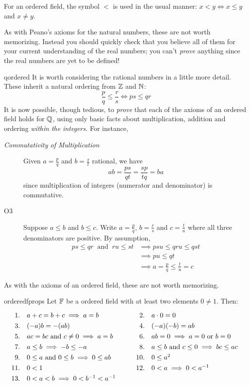 For an ordered field, the symbol $<$ is used in the usual manner: $x<y\iff x\le y$ and $x\neq y$.
\smallbreak

As with Peano's axioms for the natural numbers, these are not worth memorizing. Instead you should quickly check that you believe all of them for your current understanding of the real numbers; you can't \emph{prove} anything since the real numbers are yet to be defined!
\smallbreak


\begin{example}{}{qordered}
	It is worth considering the rational numbers in a little more detail. These inherit a natural ordering from $\mathbb{Z}$ and $\mathbb{N}$:
	\[
		\frac pq\le\frac rs\iff ps\le qr \tag{remember that $q,s>0$}
	\]
  It is now possible, though tedious, to \emph{prove} that each of the axioms of an ordered field holds for $\mathbb{Q}$, using only basic facts about multiplication, addition and ordering \emph{within the integers.} For instance,
  \begin{description}
		\item[\normalfont\emph{Commutativity of Multiplication}] Given $a=\frac pq$ and $b=\frac st$ rational, we have
		\[
			ab=\frac{ps}{qt}=\frac{sp}{tq}=ba
		\]
		since multiplication of integers (numerator and denominator) is commutative.
		\item[\normalfont O3] Suppose $a\le b$ and $b\le c$. Write $a=\frac pq$, $b=\frac rs$ and $c=\frac tu$ where all three denominators are positive. By assumption,
		\begin{align*}
			ps\le qr\ \text{ and }\ ru\le st &\implies ps u\le qr u\le qs t\\
			&\implies pu\le qt \tag{divide by $s\neq 0$}\\
			&\implies a=\frac pq\le\frac tu= c
		\end{align*}
	\end{description}
\end{example}



As with the axioms of an ordered field, these are not worth memorizing.

\begin{thm}{}{orderedfprops}
	Let $\mathbb{F}$ be a ordered field with at least two elements $0\neq 1$. Then:
	\[
		\def\arraystretch{1.3}
		\begin{array}{@{}rl@{\qquad\quad}rl}
	  	1.&a+c=b+c\implies a=b &2.&a\cdot 0=0\\
	  	3.&(-a)b=-(ab)&4.&(-a)(-b)=ab\\
	  	5.&ac=bc \text{ and } c\neq 0\implies a=b &6.&ab=0\implies a=0 \text{ or }b=0\\
	  	7.&a\le b\implies -b\le -a &8.&a\le b\text{ and }c\le 0\implies bc\le ac\\
	  	9.&0\le a\text{ and }0\le b\implies 0\le ab&10.&0\le a^2\\
	  	11.&0<1&12.&0<a\implies 0<a^{-1}\\
	  	13.&0<a<b\implies 0<b^{-1}<a^{-1}&&
		\end{array}
	\]
\end{thm}

